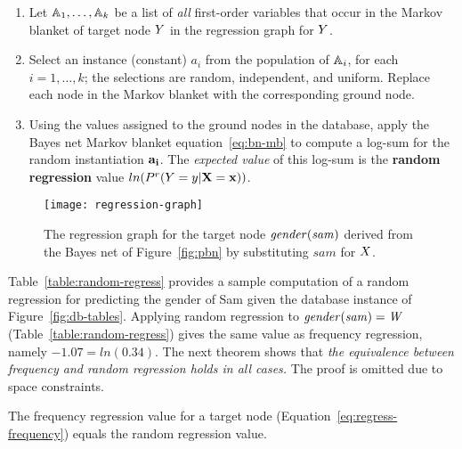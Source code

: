 \documentclass{article}
\begin{document}
\begin{enumerate}
\item Let $\mathbb{A}_{1},\ldots,\mathbb{A}_{k}$ be a list of {\em all} first-order variables that occur in the Markov blanket of target node $Y$ in the regression graph for $Y$.
\item Select an instance (constant) $a_{i}$ from the population of $\mathbb{A}_{i}$, for each $i=1,\ldots,k$; the selections are random, independent, and uniform. Replace each node in the Markov blanket with the corresponding ground node.
\item Using the values assigned to the ground nodes in the database, apply the Bayes net Markov blanket equation~\eqref{eq:bn-mb} 
to compute a log-sum for the random instantiation $\mathbf{a_{i}}$. The {\em expected value} of this log-sum is the \textbf{random regression} value $ln(P^{r}(Y = y|\mathbf{X}=\mathbf{x}))$. 
\end{enumerate}

\begin{figure}
\begin{center}
\texttt{[image: regression-graph]}
\caption{%
The regression graph for the target node $\it{gender}(sam)$ derived from the Bayes net of Figure~\ref{fig:pbn} by substituting $sam$ for $X$.
 \label{fig:regress}}
\end{center}
\end{figure}


 Table~\ref{table:random-regress} provides a sample computation of a random regression for predicting the gender of Sam given the database instance of Figure~\ref{fig:db-tables}. %
%
Applying random regression to $\it{gender}(sam) = W$ (Table~\ref{table:random-regress}) gives the same value as frequency regression, namely $-1.07=ln(0.34)$.
The next theorem shows that {\em the  equivalence between frequency and random regression holds in all cases.}  The proof is omitted due to space constraints.
\begin{theorem} \label{prop:randomize}
The frequency regression value  for a target node (Equation~\eqref{eq:regress-frequency}) equals the random regression value. 
\end{theorem}
%
\end{document}
